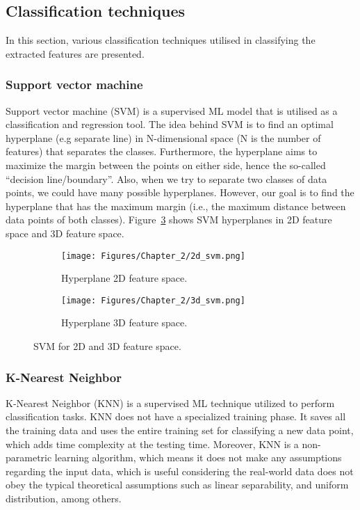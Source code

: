 \subsection{Classification techniques}
In this section, various classification techniques utilised in classifying the extracted features are presented.
\subsubsection{Support vector machine}
Support vector machine (SVM) is a supervised ML model that is utilised as a classifica\-tion and regression tool.
The idea behind SVM is to find an optimal hyperplane (e.g separate line) in N-dimensional space (N is the number of features) that separates the classes. 
Furthermore, the hyperplane aims to maximize the margin between the points on either side, hence the so-called \enquote{decision line/boundary}. 
Also, when we try to separate two classes of data points, we could have many possible hyperplanes. 
However, our goal is to find the hyperplane that has the maximum margin (i.e., the maximum distance between data points of both classes).
Figure~\ref{fig:SVM} shows SVM hyperplanes in 2D feature space and 3D feature space.
\begin{figure}[!ht]
	\centering
	\begin{subfigure}[b]{0.40\textwidth}		
		\texttt{[image: Figures/Chapter\_2/2d\_svm.png]}
		\caption{Hyperplane 2D feature space.}
		\label{fig:2dsvm}
	\end{subfigure}
	\begin{subfigure}[b]{0.49\textwidth}
		\texttt{[image: Figures/Chapter\_2/3d\_svm.png]}
		\caption{Hyperplane 3D feature space.} 
		\label{fig:3dsvm}
	\end{subfigure}	
	\caption{SVM for 2D and 3D feature space.}
	\label{fig:SVM}
\end{figure}
\subsubsection{K-Nearest Neighbor}
K-Nearest Neighbor (KNN) is a supervised ML technique utilized to perform classifica\-tion tasks.
KNN does not have a specialized training phase.
It saves all the training data and uses the entire training set for classifying a new data point, which adds time complexity at the testing time.
Moreover, KNN is a non-parametric learning algorithm, which means it does not make any assumptions regarding the input data, which is useful considering the real-world data does not obey the typical theoretical assumptions such as linear separability, and uniform distribution, among others.

